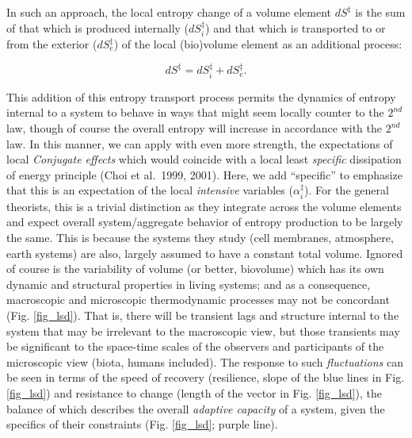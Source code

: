 \documentclass[11pt,letterpaper,]{paper}
\begin{document}
In such an approach, the local entropy change of a volume element
\(dS^\ddagger\) is the sum of that which is produced internally
(\(dS^\ddagger_i\)) and that which is transported to or from the
exterior (\(dS^\ddagger_e\)) of the local (bio)volume element as an
additional process:

\[dS^\ddagger = dS^\ddagger_i + dS^\ddagger_e.\]

This addition of this entropy transport process permits the dynamics of
entropy internal to a system to behave in ways that might seem locally
counter to the \(2^{nd}\) law, though of course the overall entropy will
increase in accordance with the \(2^{nd}\) law. In this manner, we can
apply with even more strength, the expectations of local \emph{Conjugate
effects} which would coincide with a local least \emph{specific}
dissipation of energy principle (Choi et al.~1999, 2001). Here, we add
``specific'' to emphasize that this is an expectation of the local
\emph{intensive} variables (\(\alpha_i^\ddagger\)). For the general
theorists, this is a trivial distinction as they integrate across the
volume elements and expect overall system/aggregate behavior of entropy
production to be largely the same. This is because the systems they
study (cell membranes, atmosphere, earth systems) are also, largely
assumed to have a constant total volume. Ignored of course is the
variability of volume (or better, biovolume) which has its own dynamic
and structural properties in living systems; and as a consequence,
macroscopic and microscopic thermodynamic processes may not be
concordant (Fig. \ref{fig_lsd}). That is, there will be transient lags
and structure internal to the system that may be irrelevant to the
macroscopic view, but those transients may be significant to the
space-time scales of the observers and participants of the microscopic
view (biota, humans included). The response to such \emph{fluctuations}
can be seen in terms of the speed of recovery (resilience, slope of the
blue lines in Fig. \ref{fig_lsd}) and resistance to change (length of
the vector in Fig. \ref{fig_lsd}), the balance of which describes the
overall \emph{adaptive capacity} of a system, given the specifics of
their constraints (Fig. \ref{fig_lsd}; purple line).
\end{document}
